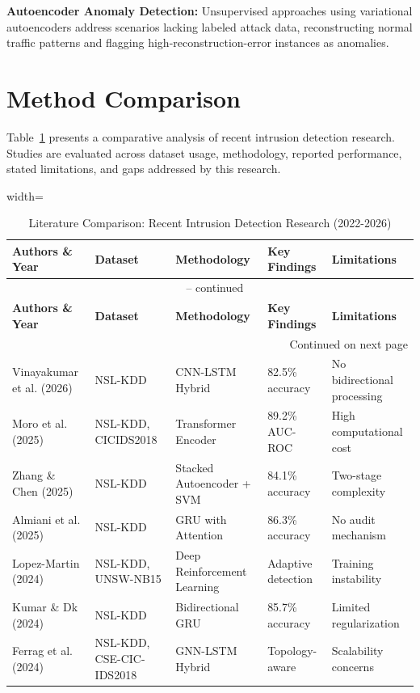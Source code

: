 \documentclass[12pt,a4paper]{report}
\begin{document}
\textbf{Autoencoder Anomaly Detection:} Unsupervised approaches using variational autoencoders address scenarios lacking labeled attack data, reconstructing normal traffic patterns and flagging high-reconstruction-error instances as anomalies.

\section{Method Comparison}

Table~\ref{tab:literature} presents a comparative analysis of recent intrusion detection research. Studies are evaluated across dataset usage, methodology, reported performance, stated limitations, and gaps addressed by this research.

\begin{adjustbox}{width=\textwidth}
\begin{longtable}{lllll}
\caption{Literature Comparison: Recent Intrusion Detection Research (2022-2026)}
\label{tab:literature}\\
\toprule
\textbf{Authors \& Year} & \textbf{Dataset} & \textbf{Methodology} & \textbf{Key Findings} & \textbf{Limitations} \\
\midrule
\endfirsthead
\multicolumn{5}{c}{\tablename\ \thetable{} -- continued}\\
\toprule
\textbf{Authors \& Year} & \textbf{Dataset} & \textbf{Methodology} & \textbf{Key Findings} & \textbf{Limitations} \\
\midrule
\endhead
\midrule
\multicolumn{5}{r}{Continued on next page}\\
\endfoot
\bottomrule
\endlastfoot
Vinayakumar et al. (2026) & NSL-KDD & CNN-LSTM Hybrid & 82.5\% accuracy & No bidirectional processing \\
\midrule
Moro et al. (2025) & NSL-KDD, CICIDS2018 & Transformer Encoder & 89.2\% AUC-ROC & High computational cost \\
\midrule
Zhang \& Chen (2025) & NSL-KDD & Stacked Autoencoder + SVM & 84.1\% accuracy & Two-stage complexity \\
\midrule
Almiani et al. (2025) & NSL-KDD & GRU with Attention & 86.3\% accuracy & No audit mechanism \\
\midrule
Lopez-Martin (2024) & NSL-KDD, UNSW-NB15 & Deep Reinforcement Learning & Adaptive detection & Training instability \\
\midrule
Kumar \& Dk (2024) & NSL-KDD & Bidirectional GRU & 85.7\% accuracy & Limited regularization \\
\midrule
Ferrag et al. (2024) & NSL-KDD, CSE-CIC-IDS2018 & GNN-LSTM Hybrid & Topology-aware & Scalability concerns \\

\end{longtable}
\end{adjustbox}
\end{document}
